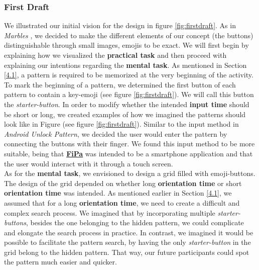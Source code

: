 \subsubsection{First Draft} \label{4.2.2.1}
We illustrated our initial vision for the design in figure \ref{fig:firstdraft}. As in \textit{Marbles} \cite{Marbles, anonymous}, we decided to make the different elements of our concept (the buttons) distinguishable through small images, emojis to be exact. We will first begin by explaining how we visualized the \textbf{practical task} and then proceed with explaining our intentions regarding the \textbf{mental task}. As mentioned in Section \ref{4.1}, a pattern is required to be memorized at the very beginning of the activity. To mark the beginning of a pattern, we determined the first button of each pattern to contain a key-emoji (see figure \ref{fig:firstdraft}). We will call this button the \textit{starter-button}. In order to modify whether the intended \textbf{input time} should be short or long, we created examples of how we imagined the patterns should look like in Figure (see figure \ref{fig:firstdraft}). Similar to the input method in \textit{Android Unlock Pattern}, we decided the user would enter the pattern by connecting the buttons with their finger. We found this input method to be more suitable, being that \underline{\textbf{FiPa}} was intended to be a smartphone application and that the user would interact with it through a touch screen. \\

As for the \textbf{mental task}, we envisioned to design a grid filled with emoji-buttons. The design of the grid depended on whether long \textbf{orientation time} or short \textbf{orientation time} was intended. As mentioned earlier in Section \ref{4.1}, we assumed that for a long \textbf{orientation time}, we need to create a difficult and complex search process. We imagined that by incorporating multiple \textit{starter-buttons}, besides the one belonging to the hidden pattern, we could complicate and elongate the search process in practice. In contrast, we imagined it would be possible to facilitate the pattern search, by having the only \textit{starter-button} in the grid belong to the hidden pattern. That way, our future participants could spot the pattern much easier and quicker. 

